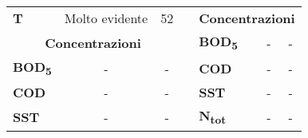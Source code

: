 \begin{table}
\begin{center}
\begin{tabular}{l|c|c|llcc}
		\multicolumn{1}{|l|}{\textbf{T}}         & \cellcolor[HTML]{C0C0C0}Molto evidente                                   & 52                                                                         & \multicolumn{1}{l|}{} & \multicolumn{3}{c|}{\textbf{Concentrazioni}}                                                                                                                                                                                           \\ \cline{1-3} \cline{5-7} 
		\multicolumn{3}{|c|}{\textbf{Concentrazioni}}                                                                                                                                                    & \multicolumn{1}{l|}{} & \multicolumn{1}{l|}{\textbf{BOD\textsubscript{5}}}    & \multicolumn{1}{c|}{-}                                                                       & \multicolumn{1}{c|}{-}                                                                          \\ \cline{1-3} \cline{5-7} 
		\multicolumn{1}{|l|}{\textbf{BOD\textsubscript{5}}}      & -                                                                        & -                                                                          & \multicolumn{1}{l|}{} & \multicolumn{1}{l|}{\textbf{COD}}     & \multicolumn{1}{c|}{-}                                                                       & \multicolumn{1}{c|}{-}                                                                          \\ \cline{1-3} \cline{5-7} 
		\multicolumn{1}{|l|}{\textbf{COD}}       & -                                                                        & -                                                                          & \multicolumn{1}{l|}{} & \multicolumn{1}{l|}{\textbf{SST}}     & \multicolumn{1}{c|}{-}                                                                       & \multicolumn{1}{c|}{-}                                                                          \\ \cline{1-3} \cline{5-7} 
		\multicolumn{1}{|l|}{\textbf{SST}}       & -                                                                        & -                                                                          & \multicolumn{1}{l|}{} & \multicolumn{1}{l|}{\textbf{N\textsubscript{tot}}}    & \multicolumn{1}{c|}{-}                                                                       & \multicolumn{1}{c|}{-}                                                                          \\ \cline{1-3} \cline{5-7} 

\end{tabular}
\end{center}
\end{table}

